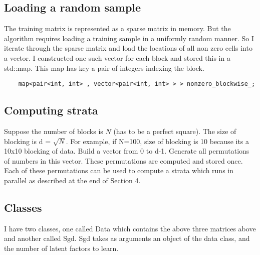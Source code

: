 \documentclass[a4paper,11pt]{article}
\begin{document}
\subsection{Loading a random sample}
The training matrix is represented as a sparse matrix in memory. But the algorithm requires loading a training sample in a uniformly random manner. So I iterate through the sparse matrix and load the locations of all non zero cells into a vector. I constructed one such vector for each block and stored this in a std::map. This map has key a pair of integers indexing the block. 
\begin{lstlisting}
	map<pair<int, int> , vector<pair<int, int> > > nonzero_blockwise_;
\end{lstlisting}
\subsection{Computing strata}
Suppose the number of blocks is $ N$ (has to be a perfect square). The size of blocking is d = $\sqrt{N}$. For example, if N=100, size of blocking is 10 because its a 10x10 blocking of data. Build a vector from 0 to d-1. Generate all permutations of numbers in this vector. These permutations are computed and stored once. Each of these permutations can be used to compute a strata which runs in parallel as described at the end of Section 4. 
\subsection{Classes}
I have two classes, one called Data which contains the above three matrices above and another called Sgd. Sgd takes as arguments an object of the data class, and the number of latent factors to learn. 
\end{document}
